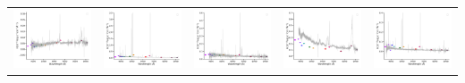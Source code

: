 \begin{center}
\begin{longtable}{l l l l l }
    \includegraphics[width=0.19\linewidth, clip]{Figs/Figs-sdss/spec-1086-52525-0146-STRIPE82-0013-036763.pdf} & \includegraphics[width=0.19\linewidth, clip]{Figs/Figs-sdss/spec-1114-53179-0599-STRIPE82-0110-008449.pdf} & \includegraphics[width=0.19\linewidth, clip]{Figs/Figs-sdss/spec-1476-52964-0017-SPLUS-s02s08-040860.pdf} & \includegraphics[width=0.19\linewidth, clip]{Figs/Figs-sdss/spec-1827-53531-0289-SPLUS-n05n50-033851.pdf} & \includegraphics[width=0.19\linewidth, clip]{Figs/Figs-sdss/spec-3589-55186-0374-STRIPE82-0015-013616.pdf} \\

\end{longtable}
\end{center}
